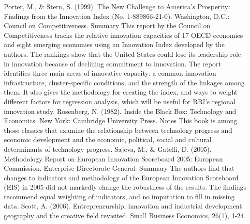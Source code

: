 \documentclass[a4paper,11pt]{article}
\begin{document}
Porter, M., & Stern, S. (1999). The New Challenge to America's Prosperity: Findings from the Innovation Index (No. 1-889866-21-0). Washington, D.C.: Council on Competitiveness.
Summary
This report by the Council on Competitiveness tracks the relative innovation capacities of 17 OECD economies and eight emerging economies using an Innovation Index developed by the authors. The rankings show that the United States could lose its leadership role in innovation because of declining commitment to innovation. The report identifies three main areas of innovative capacity: a common innovation infrastructure, cluster-specific conditions, and the strength of the linkages among them. It also gives the methodology for creating the index, and ways to weight different factors for regression analysis, which will be useful for RRI’s regional innovation study.
Rosenberg, N. (1982). Inside the Black Box: Technology and Economics. New York: Cambridge University Press.
Notes
This book is among those classics that examine the relationship between technology progress and economic development and the economic, political, social and cultural determinants of technology progress.
Sajeva, M., & Gatelli, D. (2005). Methodology Report on European Innovation Scoreboard 2005: European Commission, Enterprise Directorate-General.
Summary
The authors find that changes to indicators and methodology of the European Innovation Scoreboard (EIS) in 2005 did not markedly change the robustness of the results. The findings recommend equal weighting of indicators, and no imputation to fill in missing data.
Scott, A. (2006). Entrepreneurship, innovation and industrial development: geography and the creative field revisited. Small Business Economics, 26(1), 1-24.
 
\end{document}

